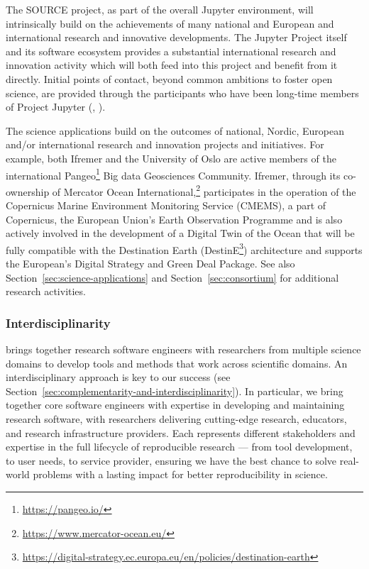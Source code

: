 The SOURCE project, as part of the overall Jupyter environment, will intrinsically build on the achievements of many
national and European and international research and innovative developments.
The Jupyter Project itself and its software ecosystem provides a substantial international
 research and innovation activity which will both feed into this project and benefit from it directly.
 Initial points of contact, beyond common ambitions to foster open science, are
 provided through the participants who have been long-time members of Project
 Jupyter (, ).
 
The science applications build on the outcomes of national, Nordic, European and/or international research and
innovation projects and initiatives. For example, both Ifremer and the University of Oslo are active members of the international
Pangeo\footnote{\url{https://pangeo.io/}} Big data Geosciences Community. Ifremer, through its co-ownership of Mercator Ocean International,\footnote{\url{https://www.mercator-ocean.eu/}}
 participates in the operation of the Copernicus Marine Environment Monitoring Service (CMEMS),
 a part of Copernicus, the European Union’s Earth Observation Programme and is also actively involved in the
 development of a Digital Twin of the Ocean that will be fully compatible with the Destination Earth (DestinE\footnote{\url{https://digital-strategy.ec.europa.eu/en/policies/destination-earth}})
 architecture and supports the European's Digital Strategy and Green Deal
 Package.
 See also Section~\ref{sec:science-applications} and 
 Section~\ref{sec:consortium} for additional research activities.

\subsubsection{Interdisciplinarity}

\TheProject{} brings together research software engineers with researchers from
multiple science domains to develop tools and methods that work across
scientific domains. An interdisciplinary approach is key to our success
(see Section~\ref{sec:complementarity-and-interdisciplinarity}).
In particular, we bring together core software engineers with expertise in developing and maintaining research software,
with researchers delivering cutting-edge research,
educators, and research infrastructure providers.
Each represents different stakeholders and expertise in the full lifecycle of reproducible research --- from tool development, to user needs, to service provider,
ensuring we have the best chance to solve real-world problems
with a lasting impact for better reproducibility in science.

